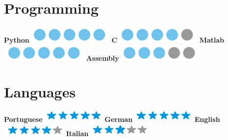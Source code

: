 \documentclass[]{friggeri-cv}
\begin{document}
\begin{aside}
	\section{Programming}
	    \textbf{Python}\includegraphics[scale=0.38]{img/5bubbles.png}
	    \textbf{C}\includegraphics[scale=0.38]{img/4bubbles.png}
	    \textbf{Matlab}\includegraphics[scale=0.38]{img/5bubbles.png}
	    \textbf{Assembly}\includegraphics[scale=0.38]{img/3bubbles.png}
	    ~
	\section{Languages}
	    \textbf{Portuguese}\includegraphics[scale=0.40]{img/5stars.png}
	    \textbf{German}\includegraphics[scale=0.40]{img/5stars.png}
	    \textbf{English}\includegraphics[scale=0.40]{img/4stars.png}
	    \textbf{Italian}\includegraphics[scale=0.40]{img/3stars.png}
	    ~

\end{aside}
\end{document}
